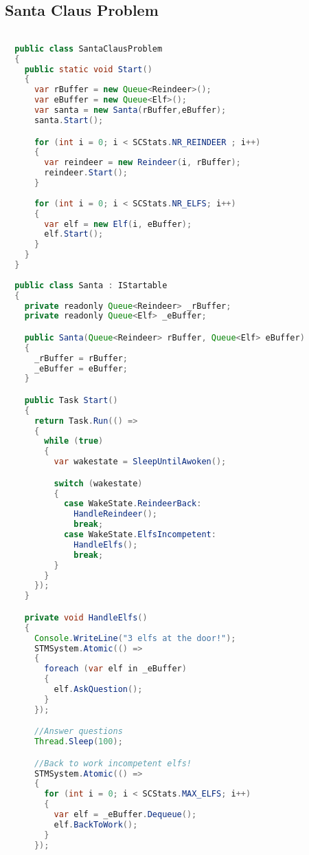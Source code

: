 \subsection{Santa Claus Problem}
\begin{lstlisting}[label=lst:impl_santa_lib,
  caption={STM Library Based Santa Claus Implementation},
  language=Java,  
  showspaces=false,
  showtabs=false,
  breaklines=true,
  showstringspaces=false,
  breakatwhitespace=true,
  commentstyle=\color{greencomments},
  keywordstyle=\color{bluekeywords},
  stringstyle=\color{redstrings},
  escapechar=~,
  morekeywords={atomic, retry, orelse, var, get, set, ref, out, readonly, virtual, override, region, endregion, foreach, lock}]  % Start your code-block

  public class SantaClausProblem
  {
    public static void Start()
    {
      var rBuffer = new Queue<Reindeer>();
      var eBuffer = new Queue<Elf>();
      var santa = new Santa(rBuffer,eBuffer);
      santa.Start();

      for (int i = 0; i < SCStats.NR_REINDEER ; i++)
      {
        var reindeer = new Reindeer(i, rBuffer);
        reindeer.Start();
      }
      
      for (int i = 0; i < SCStats.NR_ELFS; i++)
      {
        var elf = new Elf(i, eBuffer);
        elf.Start();
      }
    }
  }
  
  public class Santa : IStartable
  {
    private readonly Queue<Reindeer> _rBuffer;
    private readonly Queue<Elf> _eBuffer;

    public Santa(Queue<Reindeer> rBuffer, Queue<Elf> eBuffer)
    {
      _rBuffer = rBuffer;
      _eBuffer = eBuffer;
    }

    public Task Start()
    {
      return Task.Run(() =>
      {
        while (true)
        {
          var wakestate = SleepUntilAwoken();

          switch (wakestate)
          {
            case WakeState.ReindeerBack:
              HandleReindeer();
              break;
            case WakeState.ElfsIncompetent:
              HandleElfs();
              break;
          }
        }
      });
    }

    private void HandleElfs()
    {
      Console.WriteLine("3 elfs at the door!");
      STMSystem.Atomic(() =>
      {
        foreach (var elf in _eBuffer)
        {
          elf.AskQuestion();
        }
      });

      //Answer questions
      Thread.Sleep(100);

      //Back to work incompetent elfs!
      STMSystem.Atomic(() =>
      {
        for (int i = 0; i < SCStats.MAX_ELFS; i++)
        {
          var elf = _eBuffer.Dequeue();
          elf.BackToWork();
        }
      });


\end{lstlisting}
